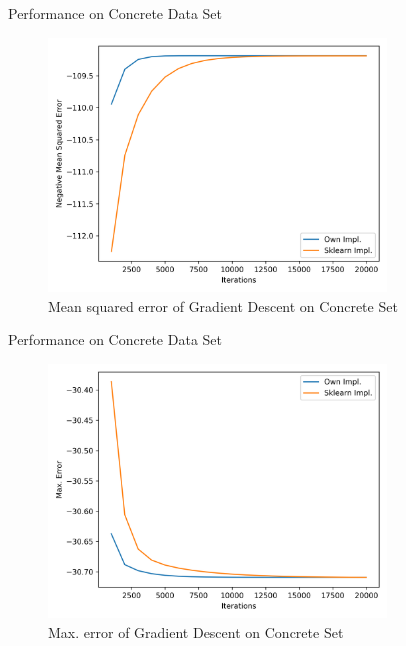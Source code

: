\documentclass[10pt]{beamer}
\begin{document}
    \begin{frame}{Performance on Concrete Data Set}
        \begin{figure}[h!]
            \centering
            \includegraphics[width=0.8\textwidth]{exercise_2/presentation/figures/concrete_gradient-descent_scores_mean_sq_err.png}
            \caption{Mean squared error of Gradient Descent on Concrete Set}
            \label{fig:Grad_Concrete_MSE}
       \end{figure}    
    \end{frame}
    
    \begin{frame}{Performance on Concrete Data Set}
        \begin{figure}[h!]
            \centering
            \includegraphics[width=0.8\textwidth]{exercise_2/presentation/figures/concrete_gradient-descent_scores_max_error.png}
            \caption{Max. error of Gradient Descent on Concrete Set}
            \label{fig:Grad_Concrete_max-error}
        \end{figure}        
    \end{frame}
    
\end{document}
